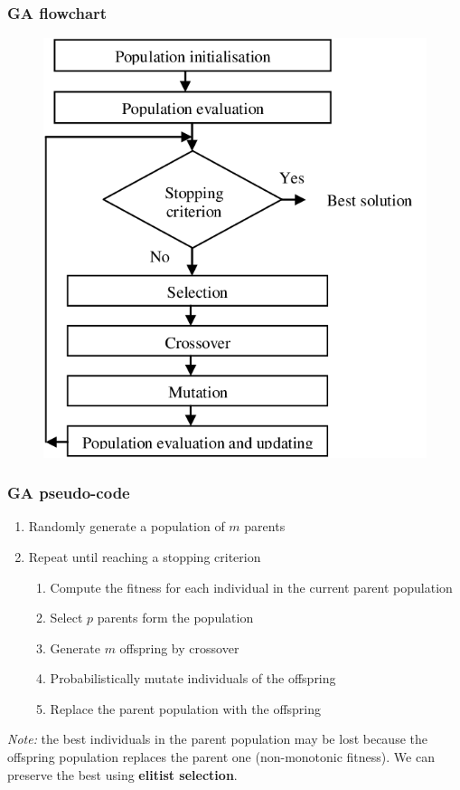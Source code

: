 \documentclass{beamer}
\begin{document}
	\begin{frame}
		\frametitle{GA flowchart}
		\begin{figure}
			\centering
			\includegraphics[scale=0.3]{images/ga_scheme}
		\end{figure}
		
	\end{frame}
		
		\begin{frame}
			\frametitle{GA pseudo-code}
			\begin{enumerate}
				\item Randomly generate a population of $m$ parents
				\item Repeat until reaching a stopping criterion
				\begin{enumerate}
					\item Compute the fitness for each individual in the current parent population
					\item Select $p$ parents form the population
					 \item Generate $m$ offspring by crossover
					 \item Probabilistically mutate individuals of the offspring
					 \item Replace the parent population with the offspring
				\end{enumerate}
			\end{enumerate}
			
			\vspace{5mm}
			
			\textit{Note:} the best individuals in the parent population may be lost because the offspring population replaces the parent one (non-monotonic fitness). We can preserve the best using \textbf{elitist selection}.
		\end{frame}
			
\end{document}
